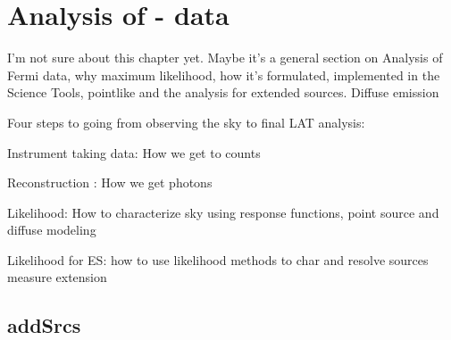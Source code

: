 \chapter{Analysis of \lat- data}
\label{chap:fermiData}
I'm not sure about this chapter yet. Maybe it's a general section on Analysis of Fermi data, why maximum likelihood, how it's formulated,  implemented in the Science Tools, pointlike and the analysis for extended sources. Diffuse emission

Four steps to going from observing the sky to final LAT analysis:

Instrument taking data: How we get to counts

Reconstruction : How we get photons

Likelihood: How to characterize sky using response functions, point source  and diffuse modeling

Likelihood for ES: how to use likelihood methods to char and resolve sources measure  extension


\section{addSrcs}

